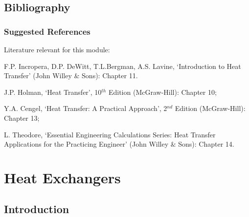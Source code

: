 \documentclass[10pt,compress,unknownkeysallowed]{beamer}
\begin{document}
\subsection{Bibliography} 

\begin{frame}
 \frametitle{Suggested References}
  Literature relevant for this module:
  \begin{enumerate}[{[}1{]}]
    \item F.P. Incropera, D.P. DeWitt, T.L.Bergman, A.S. Lavine, `Introduction to Heat Transfer' (John Willey $\&$ Sons): Chapter 11.
    \item J.P. Holman, `Heat Transfer', 10$^{th}$ Edition (McGraw-Hill): Chapter 10;
    \item Y.A. Cengel, `Heat Transfer: A Practical Approach', 2$^{nd}$ Edition (McGraw-Hill): Chapter 13;
    \item L. Theodore, `Essential Engineering Calculations Series: Heat Transfer Applications for the Practicing Engineer' (John Willey $\&$ Sons): Chapter 14.
  \end{enumerate}
\end{frame}


\section{Heat Exchangers} 

\subsection{Introduction}
\end{document}
